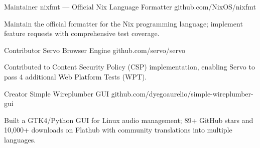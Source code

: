 

\begin{cventries}

\cventry
{Maintainer} %
{nixfmt --- Official Nix Language Formatter} %
{github.com/NixOS/nixfmt} %
{} %
{
  \begin{cvitems}
    \item{Maintain the official formatter for the Nix programming language; implement feature requests with comprehensive test coverage.}
  \end{cvitems}
}

\cventry
{Contributor} %
{Servo Browser Engine} %
{github.com/servo/servo} %
{} %
{
  \begin{cvitems}
    \item{Contributed to Content Security Policy (CSP) implementation, enabling Servo to pass 4 additional Web Platform Tests (WPT).}
  \end{cvitems}
}

\cventry
{Creator} %
{Simple Wireplumber GUI} %
{github.com/dyegoaurelio/simple-wireplumber-gui} %
{} %
{
  \begin{cvitems}
    \item{Built a GTK4/Python GUI for Linux audio management; 89+ GitHub stars and 10,000+ downloads on Flathub with community translations into multiple languages.}
  \end{cvitems}
}

\end{cventries}
